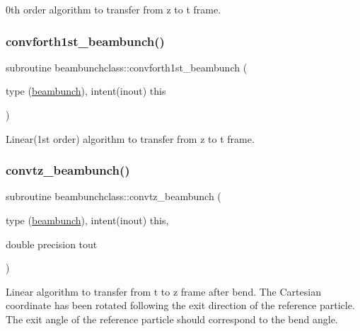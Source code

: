 0th order algorithm to transfer from z to t frame. 

\mbox{\label{namespacebeambunchclass_a35f6511340579ba6bb5f07bebf6d09d5}} 
\subsubsection{\texorpdfstring{convforth1st\_beambunch()}{convforth1st\_beambunch()}}
{\footnotesize\ttfamily subroutine beambunchclass\+::convforth1st\+\_\+beambunch (\begin{DoxyParamCaption}\item[{type (\mbox{\hyperlink{namespacebeambunchclass_structbeambunchclass_1_1beambunch}{beambunch}}), intent(inout)}]{this }\end{DoxyParamCaption})}



Linear(1st order) algorithm to transfer from z to t frame. 

\mbox{\label{namespacebeambunchclass_a9d14e9a28575e2d4d173669b8e0356a7}} 
\subsubsection{\texorpdfstring{convtz\_beambunch()}{convtz\_beambunch()}}
{\footnotesize\ttfamily subroutine beambunchclass\+::convtz\+\_\+beambunch (\begin{DoxyParamCaption}\item[{type (\mbox{\hyperlink{namespacebeambunchclass_structbeambunchclass_1_1beambunch}{beambunch}}), intent(inout)}]{this,  }\item[{double precision}]{tout }\end{DoxyParamCaption})}



Linear algorithm to transfer from t to z frame after bend. The Cartesian coordinate has been rotated following the exit direction of the reference particle. The exit angle of the reference particle should correspond to the bend angle. 

\mbox{\label{namespacebeambunchclass_a82f485cba1b5e039b1a25b4b4bd9d81f}} 
